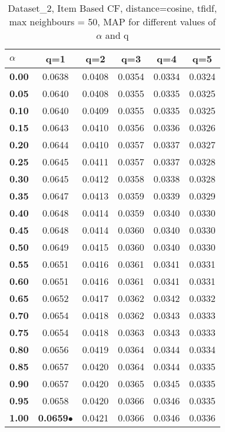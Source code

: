 \begin{table}
\begin{center}
\begin{tabular}{ | l || c | c | c | c | c |}
\hline
\textbf{$\alpha$} & \textbf{q=1} & \textbf{q=2} & \textbf{q=3} & \textbf{q=4} & \textbf{q=5} \\
\hline
\textbf{0.00} & 0.0638 & 0.0408 & 0.0354 & 0.0334 & 0.0324\\
\hline
\textbf{0.05} & 0.0640 & 0.0408 & 0.0355 & 0.0335 & 0.0325\\
\hline
\textbf{0.10} & 0.0640 & 0.0409 & 0.0355 & 0.0335 & 0.0325\\
\hline
\textbf{0.15} & 0.0643 & 0.0410 & 0.0356 & 0.0336 & 0.0326\\
\hline
\textbf{0.20} & 0.0644 & 0.0410 & 0.0357 & 0.0337 & 0.0327\\
\hline
\textbf{0.25} & 0.0645 & 0.0411 & 0.0357 & 0.0337 & 0.0328\\
\hline
\textbf{0.30} & 0.0645 & 0.0412 & 0.0358 & 0.0338 & 0.0328\\
\hline
\textbf{0.35} & 0.0647 & 0.0413 & 0.0359 & 0.0339 & 0.0329\\
\hline
\textbf{0.40} & 0.0648 & 0.0414 & 0.0359 & 0.0340 & 0.0330\\
\hline
\textbf{0.45} & 0.0648 & 0.0414 & 0.0360 & 0.0340 & 0.0330\\
\hline
\textbf{0.50} & 0.0649 & 0.0415 & 0.0360 & 0.0340 & 0.0330\\
\hline
\textbf{0.55} & 0.0651 & 0.0416 & 0.0361 & 0.0341 & 0.0331\\
\hline
\textbf{0.60} & 0.0651 & 0.0416 & 0.0361 & 0.0341 & 0.0331\\
\hline
\textbf{0.65} & 0.0652 & 0.0417 & 0.0362 & 0.0342 & 0.0332\\
\hline
\textbf{0.70} & 0.0654 & 0.0418 & 0.0362 & 0.0343 & 0.0333\\
\hline
\textbf{0.75} & 0.0654 & 0.0418 & 0.0363 & 0.0343 & 0.0333\\
\hline
\textbf{0.80} & 0.0656 & 0.0419 & 0.0364 & 0.0344 & 0.0334\\
\hline
\textbf{0.85} & 0.0657 & 0.0420 & 0.0364 & 0.0344 & 0.0335\\
\hline
\textbf{0.90} & 0.0657 & 0.0420 & 0.0365 & 0.0345 & 0.0335\\
\hline
\textbf{0.95} & 0.0658 & 0.0420 & 0.0366 & 0.0346 & 0.0335\\
\hline
\textbf{1.00} & \textbf{0.0659}$\bullet$ & 0.0421 & 0.0366 & 0.0346 & 0.0336\\
\hline
\end{tabular}
\caption{Dataset\_2, Item Based CF, distance=cosine, tfidf, max neighbours = 50, MAP for different values of $\alpha$ and q}
\label{table:MAP_Dataset_2_icf_cosine_tfidf_mnn=50}
\end{center}
\end{table}
